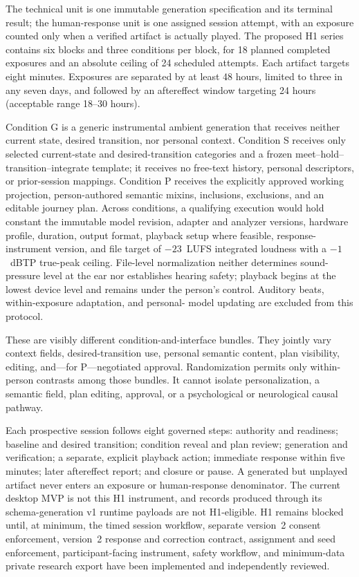 The technical unit is one immutable generation specification and its terminal
result; the human-response unit is one assigned session attempt, with an
exposure counted only when a verified artifact is actually played. The proposed
H1 series contains six blocks and three conditions per block, for 18 planned
completed exposures and an absolute ceiling of 24 scheduled attempts. Each
artifact targets eight minutes. Exposures are separated by at least 48 hours,
limited to three in any seven days, and followed by an aftereffect window
targeting 24 hours (acceptable range 18--30 hours).

Condition G is a generic instrumental ambient generation that receives neither
current state, desired transition, nor personal context. Condition S receives
only selected current-state and desired-transition categories and a frozen
meet--hold--transition--integrate template; it receives no free-text history,
personal descriptors, or prior-session mappings. Condition P receives the
explicitly approved working projection, person-authored semantic mixins,
inclusions, exclusions, and an editable journey plan. Across conditions, a
qualifying execution would hold constant the immutable model revision, adapter
and analyzer versions, hardware profile, duration, output format, playback
setup where feasible, response-instrument version, and file target of
$-23$~LUFS integrated loudness with a $-1$~dBTP true-peak ceiling. File-level
normalization neither determines sound-pressure level at the ear nor establishes
hearing safety; playback begins at the lowest device level and remains under
the person's control. Auditory beats, within-exposure adaptation, and personal-
model updating are excluded from this protocol.

These are visibly different condition-and-interface bundles. They jointly vary
context fields, desired-transition use, personal semantic content, plan
visibility, editing, and---for P---negotiated approval. Randomization permits
only within-person contrasts among those bundles. It cannot isolate
personalization, a semantic field, plan editing, approval, or a psychological
or neurological causal pathway.

Each prospective session follows eight governed steps: authority and readiness;
baseline and desired transition; condition reveal and plan review; generation
and verification; a separate, explicit playback action; immediate response
within five minutes; later aftereffect report; and closure or pause. A generated
but unplayed artifact never enters an exposure or human-response denominator.
The current desktop MVP is not this H1 instrument, and records produced through
its schema-generation v1 runtime payloads are not H1-eligible. H1 remains
blocked until, at minimum, the timed session workflow, separate version~2 consent enforcement,
version~2 response and correction contract, assignment and seed enforcement,
participant-facing instrument, safety workflow, and minimum-data private
research export have been implemented and independently reviewed.

